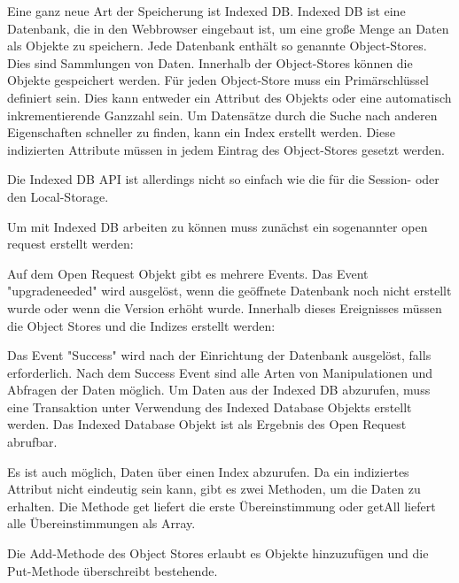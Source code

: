 
Eine ganz neue Art der Speicherung ist Indexed DB. Indexed DB ist eine Datenbank, die in den Webbrowser eingebaut ist, um eine große Menge an Daten als Objekte zu speichern. Jede Datenbank enthält so genannte Object-Stores. Dies sind Sammlungen von Daten. Innerhalb der Object-Stores können die Objekte gespeichert werden. Für jeden Object-Store muss ein Primärschlüssel definiert sein. Dies kann entweder ein Attribut des Objekts oder eine automatisch inkrementierende Ganzzahl sein. Um Datensätze durch die Suche nach anderen Eigenschaften schneller zu finden, kann ein Index erstellt werden. Diese indizierten Attribute müssen in jedem Eintrag des Object-Stores gesetzt werden.

Die Indexed DB API ist allerdings nicht so einfach wie die für die Session- oder den Local-Storage. 

Um mit Indexed DB arbeiten zu können muss zunächst ein sogenannter open request erstellt werden:


Auf dem Open Request Objekt gibt es mehrere Events. Das Event "upgradeneeded" wird ausgelöst, wenn die geöffnete Datenbank noch nicht erstellt wurde oder wenn die Version erhöht wurde. Innerhalb dieses Ereignisses müssen die Object Stores und die Indizes erstellt werden: 


Das Event "Success" wird nach der Einrichtung der Datenbank ausgelöst, falls erforderlich. Nach dem Success Event sind alle Arten von Manipulationen und Abfragen der Daten möglich. Um Daten aus der Indexed DB abzurufen, muss eine Transaktion unter Verwendung des Indexed Database Objekts erstellt werden. Das Indexed Database Objekt ist als Ergebnis des Open Request abrufbar.


Es ist auch möglich, Daten über einen Index abzurufen. Da ein indiziertes Attribut nicht eindeutig sein kann, gibt es zwei Methoden, um die Daten zu erhalten. Die Methode get liefert die erste Übereinstimmung oder getAll liefert alle Übereinstimmungen als Array.


Die Add-Methode des Object Stores erlaubt es Objekte hinzuzufügen und die Put-Methode überschreibt bestehende.
\cite{MDNIndexedDB}
\cite{MDNUsingIndexedDB}